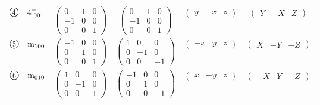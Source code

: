\documentclass[fleqn,10pt,landscape]{jsarticle}
\begin{document}
\begin{center}
\begin{longtable}{lcccc}
$ {\ooalign{\hfil\resizebox{.8\width}{\height}{4}\hfil\crcr\raise.1ex\hbox{\large$\bigcirc$}}}\quad 4^{-}_{\,\,001} $ & $ \begin{pmatrix} 0 & 1 & 0 \\ -1 & 0 & 0 \\ 0 & 0 & 1 \end{pmatrix} $ & $ \begin{pmatrix} 0 & 1 & 0 \\ -1 & 0 & 0 \\ 0 & 0 & 1 \end{pmatrix} $ & $ \begin{pmatrix} y & - x & z \end{pmatrix} $ & $ \begin{pmatrix} Y & - X & Z \end{pmatrix} $ \\
$ {\ooalign{\hfil\resizebox{.8\width}{\height}{5}\hfil\crcr\raise.1ex\hbox{\large$\bigcirc$}}}\quad {\rm m}_{100} $ & $ \begin{pmatrix} -1 & 0 & 0 \\ 0 & 1 & 0 \\ 0 & 0 & 1 \end{pmatrix} $ & $ \begin{pmatrix} 1 & 0 & 0 \\ 0 & -1 & 0 \\ 0 & 0 & -1 \end{pmatrix} $ & $ \begin{pmatrix} - x & y & z \end{pmatrix} $ & $ \begin{pmatrix} X & - Y & - Z \end{pmatrix} $ \\
$ {\ooalign{\hfil\resizebox{.8\width}{\height}{6}\hfil\crcr\raise.1ex\hbox{\large$\bigcirc$}}}\quad {\rm m}_{010} $ & $ \begin{pmatrix} 1 & 0 & 0 \\ 0 & -1 & 0 \\ 0 & 0 & 1 \end{pmatrix} $ & $ \begin{pmatrix} -1 & 0 & 0 \\ 0 & 1 & 0 \\ 0 & 0 & -1 \end{pmatrix} $ & $ \begin{pmatrix} x & - y & z \end{pmatrix} $ & $ \begin{pmatrix} - X & Y & - Z \end{pmatrix} $ \\

\end{longtable}
\end{center}
\end{document}
